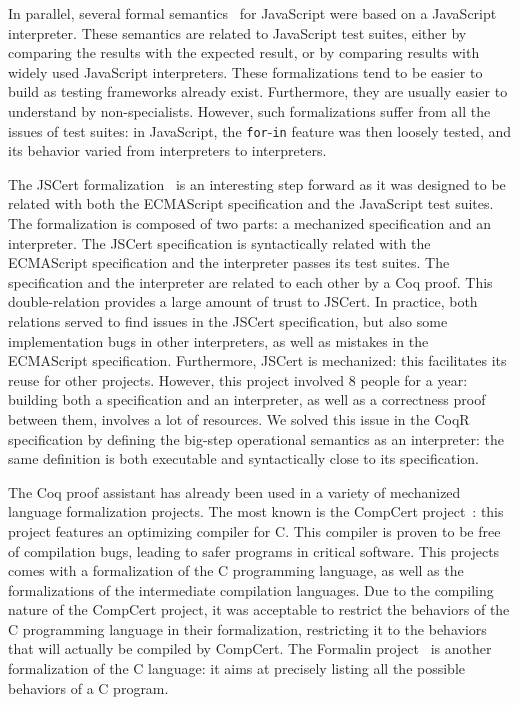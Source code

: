 \documentclass[
    sigplan,
    10pt,
    review, %
    natbib=false %
 ]{acmart}
\newcommand\CoqR{CoqR}
\begin{document}
In parallel, several formal semantics~\parencite{js-ml, Guha2010, Politz:S5, kjs}
for JavaScript were based on a JavaScript interpreter.
These semantics are related to JavaScript test suites,
either by comparing the results with the expected result,
or by comparing results with widely used JavaScript interpreters.
These formalizations tend to be easier to build
as testing frameworks already exist.
Furthermore, they are usually easier to understand by non-specialists.
However, such formalizations suffer from all the issues of test suites:
in JavaScript, the \texttt{for}-\texttt{in}
feature was then loosely tested,
and its behavior varied from interpreters to interpreters.

The JSCert formalization~\parencite{popl14jscert}
is an interesting step forward as it was designed
to be related with both the ECMAScript specification and the JavaScript test suites.
The formalization is composed of two parts:
a mechanized specification and an interpreter.
The JSCert specification is syntactically related with the ECMAScript specification
and the interpreter passes its test suites.
The specification and the interpreter are related to each other by a Coq proof.
This double-relation provides a large amount of trust to JSCert.
In practice, both relations served to find issues in the JSCert specification,
but also some implementation bugs in other interpreters,
as well as mistakes in the ECMAScript specification.
Furthermore, JSCert is mechanized:
this facilitates its reuse for other projects.
However, this project involved 8 people for a year:
building both a specification and an interpreter,
as well as a correctness proof between them, involves a lot of resources.
We solved this issue in the \CoqR{} specification
by defining the big-step operational semantics as an interpreter:
the same definition is both executable and syntactically close to its specification.

The Coq proof assistant has already been used
in a variety of mechanized language formalization projects.
The most known is the CompCert project~\cite{Leroy-Compcert-CACM}:
this project features an optimizing compiler for C.
This compiler is proven to be free of compilation bugs,
leading to safer programs in critical software.
This projects comes with a formalization of the C programming language,
as well as the formalizations of the intermediate compilation languages.
%
Due to the compiling nature of the CompCert project,
it was acceptable to restrict the behaviors of the C programming language
in their formalization,
restricting it to the behaviors that will actually be compiled by CompCert.
The Formalin project~\parencite{formalin} is another formalization
of the C language:
it aims at precisely listing all the possible behaviors of a C program.
\end{document}

